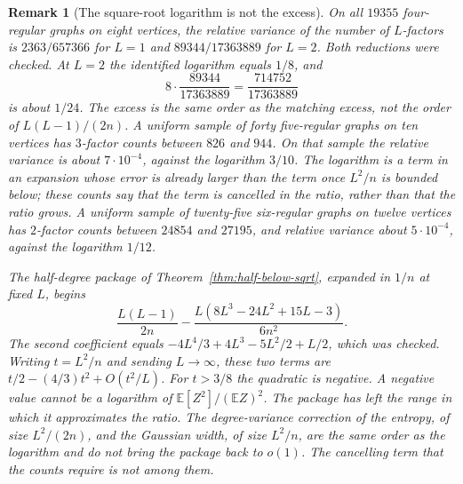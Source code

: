 \documentclass[11pt]{article}
\newtheorem{remark}[theorem]{Remark}
\newcommand{\EE}{\mathbb{E}}
\begin{document}
\begin{remark}[The square-root logarithm is not the excess]
\label{rem:eight-factors}
On all \(19355\) four-regular graphs on eight vertices, the relative
variance of the number of \(L\)-factors is \(2363/657366\) for \(L=1\) and
\(89344/17363889\) for \(L=2\). Both reductions were checked. At \(L=2\) the
identified logarithm equals \(1/8\), and
\[
8\cdot\frac{89344}{17363889}
=
\frac{714752}{17363889}
\]
is about \(1/24\). The excess is the same order as the matching excess, not
the order of \(L(L-1)/(2n)\). A uniform sample of forty five-regular graphs
on ten vertices has \(3\)-factor counts between \(826\) and \(944\). On that
sample the relative variance is about \(7\cdot 10^{-4}\), against the
logarithm \(3/10\). The logarithm is a term in an expansion whose error is
already larger than the term once \(L^2/n\) is bounded below; these counts
say that the term is cancelled in the ratio, rather than that the ratio
grows.
A uniform sample of twenty-five six-regular graphs on twelve vertices has
\(2\)-factor counts between \(24854\) and \(27195\), and relative variance
about \(5\cdot 10^{-4}\), against the logarithm \(1/12\).

The half-degree package of Theorem~\ref{thm:half-below-sqrt}, expanded in
\(1/n\) at fixed \(L\), begins
\[
\frac{L(L-1)}{2n}
-\frac{L(8L^3-24L^2+15L-3)}{6n^2}.
\]
The second coefficient equals
\(-4L^4/3+4L^3-5L^2/2+L/2\), which was checked.
Writing \(t=L^2/n\) and sending \(L\to\infty\), these two terms are
\(t/2-(4/3)t^2+O(t^2/L)\).
For \(t>3/8\) the quadratic is negative.
A negative value cannot be a logarithm of \(\EE[Z^2]/(\EE Z)^2\).
The package has left the range in which it approximates the ratio.
The degree-variance correction of the entropy, of size \(L^2/(2n)\), and the
Gaussian width, of size \(L^2/n\), are the same order as the logarithm and do
not bring the package back to \(o(1)\).
The cancelling term that the counts require is not among them.
\end{remark}
\end{document}
